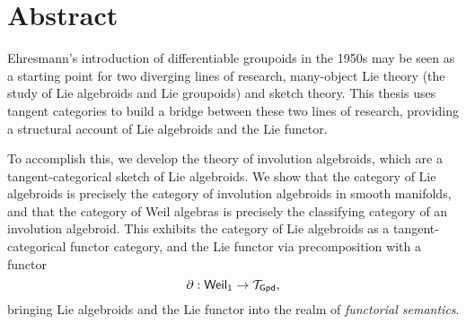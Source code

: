 
\chapter{Abstract}


Ehresmann's introduction of differentiable groupoids in the 1950s may be seen as a starting point for two diverging lines of research, many-object Lie theory (the study of Lie algebroids and Lie groupoids) and sketch theory. This thesis uses tangent categories to build a bridge between these two lines of research, providing a structural account of Lie algebroids and the Lie functor. 

To accomplish this, we develop the theory of involution algebroids, which are a tangent-categorical sketch of Lie algebroids. We show that the category of Lie algebroids is precisely the category of involution algebroids in smooth manifolds, and that the category of Weil algebras is precisely the classifying category of an involution algebroid. This exhibits the category of Lie algebroids as a tangent-categorical functor category, and the Lie functor via precomposition with a functor
\[
    \partial: \mathsf{Weil}_1 \to \mathcal{T}_{\mathsf{Gpd}},
\]bringing Lie algebroids and the Lie functor into the realm of \emph{functorial semantics}.


